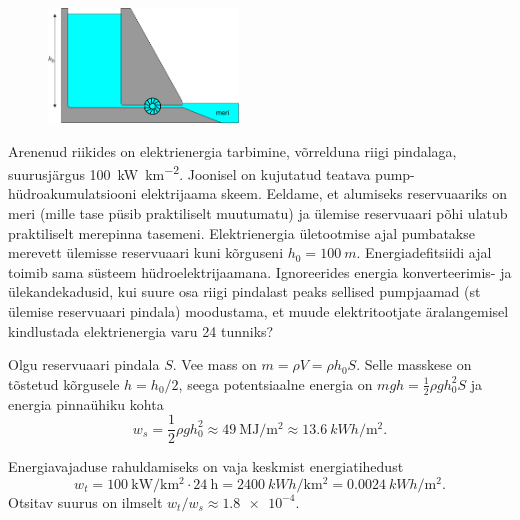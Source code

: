 
\begin{figure}
    \vspace{-23pt}
	\includegraphics[width=0.45\textwidth]{2019-lahg-02-yl.pdf}
\end{figure}

Arenenud riikides on elektrienergia tarbimine, võrrelduna riigi pindalaga, suurusjärgus \SI{100}{\kilo\watt\per\kilo\meter\squared}. Joonisel on kujutatud teatava pump-hüdroakumulatsiooni elektrijaama skeem. Eeldame, et alumiseks reservuaariks on meri (mille tase püsib praktiliselt muutumatu) ja ülemise reservuaari põhi ulatub praktiliselt merepinna tasemeni. Elektrienergia ületootmise ajal pumbatakse merevett ülemisse reservuaari kuni kõrguseni $h_0=\SI{100}{m}$. Energiadefitsiidi ajal toimib sama süsteem hüdroelektrijaamana. Ignoreerides energia konverteerimis- ja ülekandekadusid, kui suure osa riigi pindalast peaks sellised pumpjaamad (st ülemise reservuaari pindala) moodustama, et muude elektritootjate äralangemisel kindlustada elektrienergia varu 24 tunniks?


\hint

\solu
Olgu reservuaari pindala $S$. Vee mass on $m=\rho V=\rho h_0S$. Selle masskese on tõstetud kõrgusele $h=h_0/2$, seega potentsiaalne energia on $mgh=\frac{1}{2}\rho gh_0^2S$ ja energia pinnaühiku kohta
\[
w_s=\frac{1}{2}\rho gh_0^2\approx \SI{49}{\mega\joule\per\meter\squared}\approx\SI{13.6}{kWh\per\meter\squared}.
\]

Energiavajaduse rahuldamiseks on vaja keskmist energiatihedust
\[
w_t=\SI{100}{\kilo\watt\per\kilo\meter\squared}\cdot \SI{24}{\hour}=\SI{2400}{kWh\per\kilo\meter\squared}=\SI{0.0024}{kWh\per\meter\squared}.
\]
Otsitav suurus on ilmselt $w_t/w_s\approx \num{1.8e-4}$.
\probend